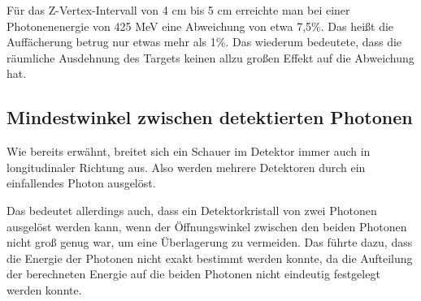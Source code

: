 \documentclass[a4paper,11pt,oneside,final,german,openbib,pdftex]{scrbook}
\begin{document}
{Für das Z-Vertex-Intervall von 4 cm bis 5 cm erreichte man bei einer Photonenenergie von 425 MeV eine Abweichung von etwa 7,5\%. Das heißt die Auffächerung betrug nur etwas mehr als 1\%. Das wiederum bedeutete, dass die räumliche Ausdehnung des Targets keinen allzu großen Effekt auf die Abweichung hat.



\subsection{Mindestwinkel zwischen detektierten Photonen}
\label{sec:Min-Openingangle}


Wie bereits erw\"ahnt, breitet sich ein Schauer im Detektor immer auch in longitudinaler Richtung aus. Also werden mehrere Detektoren durch ein einfallendes Photon ausgel\"ost.

Das bedeutet allerdings auch, dass ein Detektorkristall von zwei Photonen ausgel\"ost werden kann, wenn der \"Offnungswinkel zwischen den beiden Photonen nicht gro{\ss} genug war, um eine \"Uberlagerung zu vermeiden. Das f\"uhrte dazu, dass die Energie der Photonen nicht exakt bestimmt werden konnte, da die Aufteilung der berechneten Energie auf die beiden Photonen nicht eindeutig festgelegt werden konnte.

}
\end{document}

